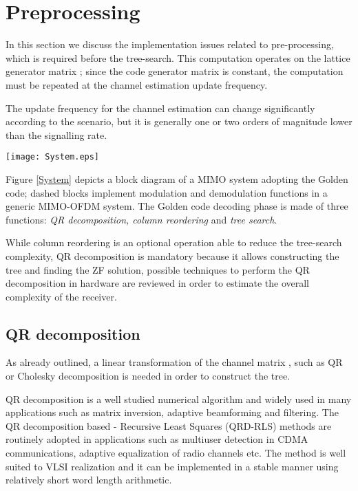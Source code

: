 \documentclass[12pt,onecolumn,draftclsnofoot]{IEEEtran}
\begin{document}
\section{Preprocessing}

\label{Preproc} In this section we discuss the implementation issues
related to pre-processing, which is required before the tree-search.
This computation operates on the lattice generator matrix ; since the code generator matrix is constant, the computation
must be repeated at the channel estimation update frequency.

The update frequency for the channel estimation can change
significantly according to the scenario, but it is generally one or
two orders of magnitude lower than the signalling rate.
\begin{figure*}[t!]
    \begin{center}
    \texttt{[image: System.eps]} \caption{Golden Code MIMO System.}
    \label{System}
    \end{center}
\end{figure*}
Figure \ref{System} depicts a block diagram of a MIMO system adopting
the Golden code; dashed blocks implement modulation and
demodulation functions in a generic MIMO-OFDM system. The Golden
code decoding phase is made of three functions: {\em
QR decomposition, column reordering} and {\em tree search}.

While column reordering is an optional operation able to reduce the
tree-search complexity, QR decomposition is mandatory because it
allows constructing the tree and finding the ZF solution, possible
techniques to perform the QR decomposition in hardware are reviewed
in order to estimate the overall complexity of the receiver.


\subsection{QR decomposition}

As already outlined, a linear transformation of the channel matrix ,
such as QR or Cholesky decomposition is needed in order to construct the tree.

QR decomposition is a well studied numerical algorithm and widely
used in many applications such as matrix inversion, adaptive
beamforming and filtering. The QR decomposition based - Recursive Least
Squares (QRD-RLS) methods are routinely adopted in applications such
as multiuser detection in CDMA communications, adaptive equalization
of radio channels etc. The method is well suited to VLSI realization
and it can be implemented in a stable manner using relatively short
word length arithmetic.
\end{document}
